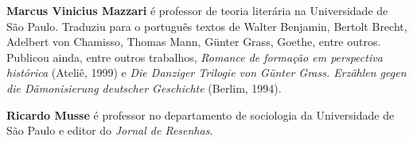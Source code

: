 \textbf{Marcus Vinicius Mazzari} é professor de teoria literária na Universidade
de São Paulo. Traduziu para o português textos de Walter Benjamin, Bertolt
Brecht, Adelbert von Chamisso, Thomas Mann, Günter Grass, Goethe, entre outros.
Publicou ainda, entre outros trabalhos, \textit{Romance de formação em perspectiva histórica}
(Ateliê, 1999) e \textit{Die Danziger Trilogie von Günter Grass. Erzählen gegen
die Dämonisierung deutscher Geschichte} (Berlim, 1994).

\textbf{Ricardo Musse} é professor no departamento de sociologia da Universidade
de São Paulo e editor do \textit{Jornal de Resenhas}.\par




